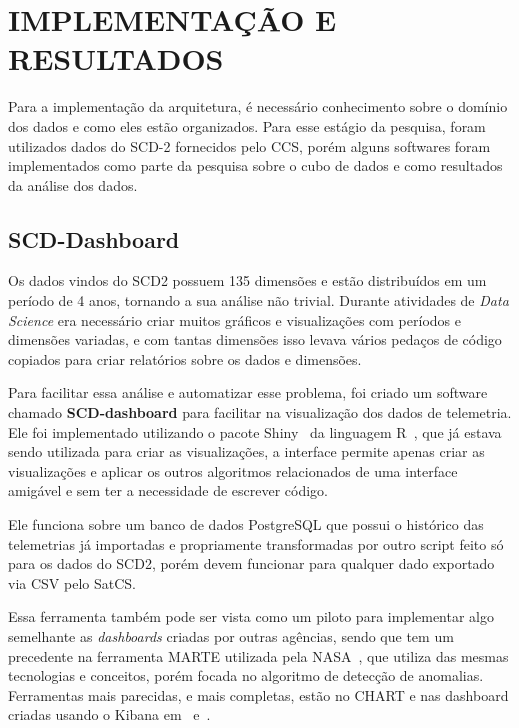 
\chapter{IMPLEMENTAÇÃO E RESULTADOS}
\label{ch:impl}

Para a implementação da arquitetura, é necessário conhecimento sobre o domínio dos dados e como eles estão organizados.
Para esse estágio da pesquisa, foram utilizados dados do SCD-2 fornecidos pelo CCS, porém alguns softwares foram implementados como parte da pesquisa sobre o cubo de dados e como resultados da análise dos dados.

\section{SCD-Dashboard}
\label{ch:impl:dash}

Os dados vindos do SCD2 possuem 135 dimensões e estão distribuídos em um período de 4 anos, tornando a sua análise não trivial.
Durante atividades de \textit{Data Science} era necessário criar muitos gráficos e visualizações com períodos e dimensões variadas, e com tantas dimensões isso levava vários pedaços de código copiados para criar relatórios sobre os dados e dimensões.

Para facilitar essa análise e automatizar esse problema, foi criado um software chamado \textbf{SCD-dashboard} para facilitar na visualização dos dados de telemetria.
Ele foi implementado utilizando o pacote Shiny~\cite{} da linguagem R~\cite{rcoreteamLanguageEnvironmentStatistical2018}, que já estava sendo utilizada para criar as visualizações, a interface permite apenas criar as visualizações e aplicar os outros algoritmos relacionados de uma interface amigável e sem ter a necessidade de escrever código.

Ele funciona sobre um banco de dados PostgreSQL que possui o histórico das telemetrias já importadas e propriamente transformadas por outro script feito só para os dados do SCD2, porém devem funcionar para qualquer dado exportado via CSV pelo SatCS.

Essa ferramenta também pode ser vista como um piloto para implementar algo semelhante as \textit{dashboards} criadas por outras agências, sendo que tem um precedente na ferramenta MARTE utilizada pela NASA~\cite{fernandezTelemetryAnomalyDetection2017}, que utiliza das mesmas tecnologias e conceitos, porém focada no algoritmo de detecção de anomalias.
Ferramentas mais parecidas, e mais completas, estão no CHART e nas dashboard criadas usando o Kibana em~\cite{mateikUsingBigData2017} e~\cite{zhangBigDataFramework2017}.

